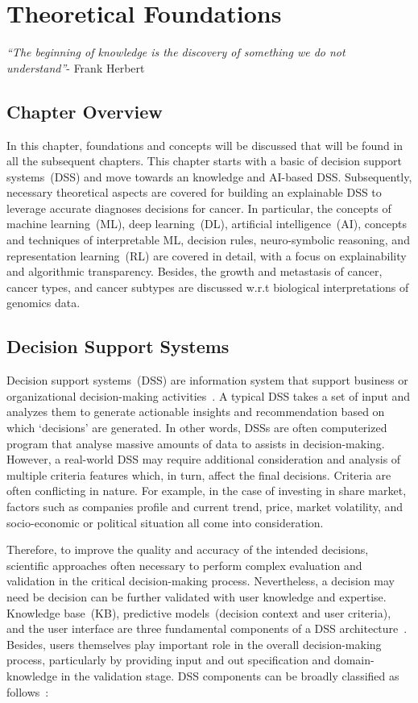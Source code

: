 \chapter{Theoretical Foundations}
\label{chapter:preli}
\textit{``The beginning of knowledge is the discovery of something we do not understand''}- Frank Herbert 

\section{Chapter Overview}
In this chapter, foundations and concepts will be discussed that will be found in all the subsequent chapters. This chapter starts with a basic of decision support systems~(DSS) and move towards an knowledge and AI-based DSS. Subsequently, necessary theoretical aspects are covered for building an explainable DSS to leverage accurate diagnoses decisions for cancer. In particular, the concepts of machine learning~(ML), deep learning~(DL), artificial intelligence~(AI), concepts and techniques of interpretable ML, decision rules, neuro-symbolic reasoning, and representation learning~(RL) are covered in detail, with a focus on explainability and algorithmic transparency. Besides, the growth and metastasis of cancer, cancer types, and cancer subtypes are discussed w.r.t biological interpretations of genomics data. 

\section{Decision Support Systems}\label{sec:DSS}
Decision support systems~(DSS) are information system that support business or organizational decision-making activities~\cite{hackathorn1981organizational}. A typical DSS takes a set of input and analyzes them to generate actionable insights and recommendation based on which `decisions' are generated. 
In other words, DSSs are often computerized program that analyse massive amounts of data to assists in decision-making. 
However, a real-world DSS may require additional consideration and analysis of multiple criteria features which, in turn, affect the final decisions.  Criteria are often conflicting in nature. For example, in the case of investing in share market, factors such as companies profile and current trend, price, market volatility, and socio-economic or political situation all come into consideration. 

\hspace*{3.5mm} Therefore, to improve the quality and accuracy of the intended decisions, scientific approaches often necessary to perform complex evaluation and validation in the critical decision-making process. Nevertheless, a decision may need be decision can be further validated with user knowledge and expertise. Knowledge base~(KB), predictive models~(decision context and user criteria), and the user interface are three fundamental components of a DSS architecture~\cite{hackathorn1981organizational}. Besides, users themselves play important role in the overall decision-making process, particularly by providing input and out specification and domain-knowledge in the validation stage. DSS components can be broadly classified as follows~\cite{hackathorn1981organizational}: 

